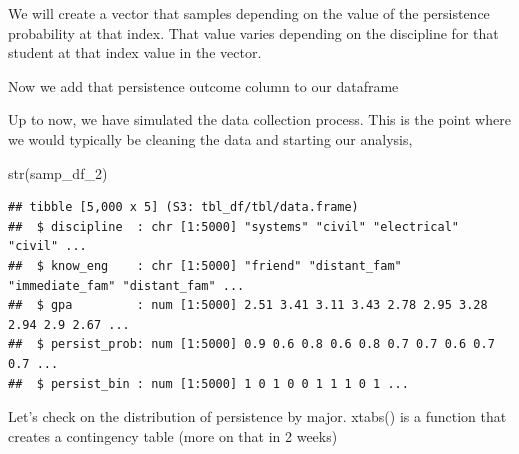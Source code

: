 \documentclass[
]{book}
\newenvironment{Shaded}{\begin{snugshade}}{\end{snugshade}}
\newcommand{\AttributeTok}[1]{\textcolor[rgb]{0.77,0.63,0.00}{#1}}
\newcommand{\DecValTok}[1]{\textcolor[rgb]{0.00,0.00,0.81}{#1}}
\newcommand{\FunctionTok}[1]{\textcolor[rgb]{0.00,0.00,0.00}{#1}}
\newcommand{\NormalTok}[1]{#1}
\newcommand{\OtherTok}[1]{\textcolor[rgb]{0.56,0.35,0.01}{#1}}
\newcommand{\SpecialCharTok}[1]{\textcolor[rgb]{0.00,0.00,0.00}{#1}}
\begin{document}
We will create a vector that samples depending on the value of the persistence probability at that index. That value varies depending on the discipline for that student at that index value in the vector.

\begin{Shaded}
\end{Shaded}

Now we add that persistence outcome column to our dataframe

\begin{Shaded}
\end{Shaded}

Up to now, we have simulated the data collection process. This is the point where we would typically be cleaning the data and starting our analysis,

\begin{Shaded}
\begin{Highlighting}[]
\FunctionTok{str}\NormalTok{(samp\_df\_2)}
\end{Highlighting}
\end{Shaded}

\begin{verbatim}
## tibble [5,000 x 5] (S3: tbl_df/tbl/data.frame)
##  $ discipline  : chr [1:5000] "systems" "civil" "electrical" "civil" ...
##  $ know_eng    : chr [1:5000] "friend" "distant_fam" "immediate_fam" "distant_fam" ...
##  $ gpa         : num [1:5000] 2.51 3.41 3.11 3.43 2.78 2.95 3.28 2.94 2.9 2.67 ...
##  $ persist_prob: num [1:5000] 0.9 0.6 0.8 0.6 0.8 0.7 0.7 0.6 0.7 0.7 ...
##  $ persist_bin : num [1:5000] 1 0 1 0 0 1 1 1 0 1 ...
\end{verbatim}

Let's check on the distribution of persistence by major. xtabs() is a function that creates a contingency table (more on that in 2 weeks)
\end{document}
